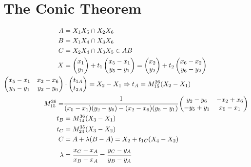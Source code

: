 \documentclass[12pt]{article}
\begin{document}


\section{The Conic Theorem}

\begin{align}
A &= X_1 X_5 \cap X_2 X_6 \\
B &= X_1 X_4 \cap X_3 X_6 \\
C &= X_2 X_4 \cap X_3 X_5 \in AB \\
X &= \begin{pmatrix}
    x_1 \\ y_1
\end{pmatrix} + t_1 \begin{pmatrix}
    x_5 - x_1 \\
    y_5 - y_1
\end{pmatrix} = \begin{pmatrix}
    x_2 \\ y_2
\end{pmatrix} + t_2 \begin{pmatrix}
    x_6 - x_2 \\
    y_6 - y_2
\end{pmatrix} \\
\begin{pmatrix}
    x_5 - x_1 & x_2 - x_6 \\
    y_5 - y_1 & y_2 - y_6
\end{pmatrix} &\cdot \begin{pmatrix}
    t_{1A} \\
    t_{2A}
\end{pmatrix} = X_2 - X_1 \Rightarrow t_A = M_{15}^{26} (X_2 - X_1)\\
M_{15}^{26} = &\cfrac{1}{(x_5 - x_1)(y_2 - y_6) - (x_2 - x_6)(y_5 - y_1)} \begin{pmatrix}
    y_2 - y_6 & -x_2 + x_6 \\
    -y_5 + y_1 & x_5 - x_1
\end{pmatrix} \\
t_B &= M_{14}^{36} (X_3 - X_1)\\
t_C &= M_{24}^{35} (X_3 - X_2) \\
C &= A + \lambda (B - A) = X_2 + t_{1C} (X_4 - X_2) \\
\lambda &= \cfrac{x_C - x_A}{x_B - x_A} = \cfrac{y_C - y_A}{y_B - y_A}
\end{align}
\end{document}
